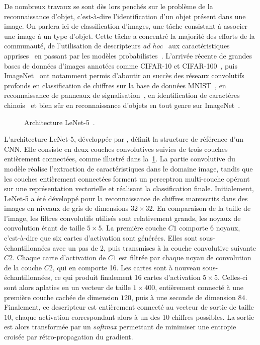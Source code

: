 De nombreux travaux se sont dès lors penchés sur le problème de la reconnaissance d'objet, c'est-à-dire l'identification d'un objet présent dans une image. On parlera ici de classification d'images, une tâche consistant à associer une image à un type d'objet. Cette tâche a concentré la majorité des efforts de la communauté, de l'utilisation de descripteurs \emph{ad hoc}~\cite{ullman_aligning_1989} aux caractéristiques apprises~\cite{vidal-naquet_object_2003} en passant par les modèles probabilistes~\cite{schneiderman_probabilistic_1998}. L'arrivée récente de grandes bases de données d'images annotées comme CIFAR-10 et CIFAR-100~\cite{krizhevsky_learning_2009}, puis ImageNet~\cite{deng_imagenet_2009,russakovsky_imagenet_2015} ont notamment permis d'aboutir au succès des réseaux convolutifs profonds en classification de chiffres sur la base de données MNIST~\cite{lecun_gradient-based_1998}, en reconnaissance de panneaux de signalisation~\cite{stallkamp_german_2011}, en identification de caractères chinois~\cite{liu_icdar_2011} et bien sûr en reconnaissance d'objets en tout genre sur ImageNet~\cite{krizhevsky_imagenet_2012}.

\begin{figure}[t]
  \resizebox{\textwidth}{!}{
    
  }
  \caption[Architecture LeNet-5.]{Architecture LeNet-5~\cite{lecun_gradient-based_1998}.}
  \label{fig:lenet}
\end{figure}

L'architecture LeNet-5, développée par \citet{lecun_gradient-based_1998}, définit la structure de référence d'un \gls{CNN}. Elle consiste en deux couches convolutives suivies de trois couches entièrement connectées, comme illustré dans la~\cref{fig:lenet}. La partie convolutive du modèle réalise l'extraction de caractéristiques dans le domaine image, tandis que les couches entièrement connectées forment un perceptron multi-couche opérant sur une représentation vectorielle et réalisant la classification finale. Initialement, LeNet-5 a été développé pour la reconnaissance de chiffres manuscrits dans des images en niveaux de gris de dimensions $32\times32$. En comparaison de la taille de l'image, les filtres convolutifs utilisés sont relativement grands, les noyaux de convolution étant de taille $5\times5$. La première couche $C1$ comporte 6 noyaux, c'est-à-dire que six cartes d'activation sont générées. Elles sont sous-échantillonnées avec un pas de 2, puis transmises à la couche convolutive suivante $C2$. Chaque carte d'activation de $C1$ est filtrée par chaque noyau de convolution de la couche $C2$, qui en comporte 16. Les cartes sont à nouveau sous-échantillonnées, ce qui produit finalement 16 cartes d'activation $5\times5$. Celles-ci sont alors aplaties en un vecteur de taille $1\times400$, entièrement connecté à une première couche cachée de dimension $120$, puis à une seconde de dimension $84$.
Finalement, ce descripteur est entièrement connecté au vecteur de sortie de taille $10$, chaque activation correspondant alors à un des 10 chiffres possibles. La sortie est alors transformée par un \emph{softmax} permettant de minimiser une entropie croisée par rétro-propagation du gradient.

